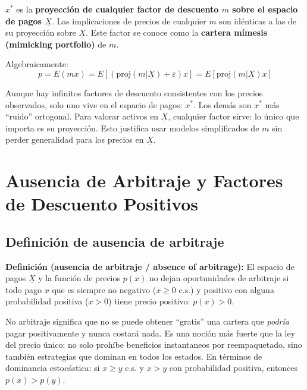 \documentclass[12pt]{article}
\begin{document}
$x^*$ es la \textbf{proyecci\'on de cualquier factor de descuento $m$ sobre el espacio de pagos $\underline{X}$}. Las implicaciones de precios de cualquier $m$ son id\'enticas a las de su proyecci\'on sobre $\underline{X}$. Este factor se conoce como la \textbf{cartera m\'imesis (mimicking portfolio)} de $m$.

Algebraicamente:
\begin{equation}
    p = E(mx) = E[(\text{proj}(m|\underline{X}) + \varepsilon)x] = E[\text{proj}(m|\underline{X})x]
\end{equation}

\begin{intuicion}
Aunque hay infinitos factores de descuento consistentes con los precios observados, solo uno vive en el espacio de pagos: $x^*$. Los dem\'as son $x^*$ m\'as ``ruido'' ortogonal. Para valorar activos en $\underline{X}$, cualquier factor sirve: lo \'unico que importa es su proyecci\'on. Esto justifica usar modelos simplificados de $m$ sin perder generalidad para los precios en $\underline{X}$.
\end{intuicion}

\section{Ausencia de Arbitraje y Factores de Descuento Positivos}

\subsection{Definici\'on de ausencia de arbitraje}

\textbf{Definici\'on (ausencia de arbitraje / absence of arbitrage):} El espacio de pagos $\underline{X}$ y la funci\'on de precios $p(x)$ no dejan oportunidades de arbitraje si todo pago $x$ que es siempre no negativo ($x \geq 0$ c.s.) y positivo con alguna probabilidad positiva ($x > 0$) tiene precio positivo: $p(x) > 0$.

\begin{intuicion}
No arbitraje significa que no se puede obtener ``gratis'' una cartera que \emph{podría} pagar positivamente y nunca costar\'a nada. Es una noci\'on m\'as fuerte que la ley del precio \'unico: no solo proh\'ibe beneficios instantaneos por reempaquetado, sino tambi\'en estrategias que dominan en todos los estados. En t\'erminos de dominancia estoc\'astica: si $x \geq y$ c.s. y $x > y$ con probabilidad positiva, entonces $p(x) > p(y)$.
\end{intuicion}
\end{document}
